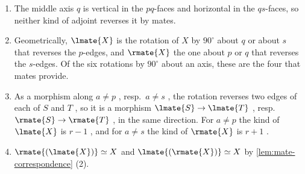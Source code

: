 \begin{rmk}
\label{rmk:cube-rotation}
%
\begin{enumerate}
\item The middle axis $q$ is vertical in the $pq$-faces and horizontal in the
$qs$-faces, so neither kind of adjoint reverses it by mates.
\item Geometrically, $\lmate{X}$ is the rotation of $X$ by $90^{\circ}$ about
$q$ or about $s$ that reverses the $p$-edges,
and $\rmate{X}$ the one about $p$ or $q$ that reverses the $s$-edges.
Of the six rotations by $90^{\circ}$ about an axis,
these are the four that mates provide.
\item As a morphism along $a \neq p$ , resp.\ $a \neq s$ ,
the rotation reverses two edges of each of $S$ and $T$ , so it is a morphism
$\lmate{S} \to \lmate{T}$ ,
resp.\
$\rmate{S} \to \rmate{T}$ ,
in the same direction. For $a \neq p$ the kind of $\lmate{X}$ is $r-1$ ,
and for $a \neq s$ the kind of $\rmate{X}$ is $r+1$ .
\item
$\rmate{(\lmate{X})} \simeq X$
and
$\lmate{(\rmate{X})} \simeq X$
by \cref{lem:mate-correspondence} (2).
\end{enumerate}
\end{rmk}

